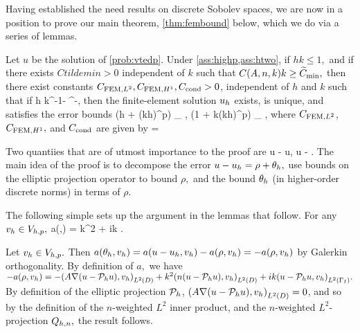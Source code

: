 Having established the need results on discrete Sobolev spaces, we are now in a position to prove our main theorem, \cref{thm:fembound} below, which we do via a series of lemmas.

\label{thm:fembound}
Let $u$ be the solution of \cref{prob:vtedp}. Under \cref{ass:highp,ass:htwo}, if $hk \leq 1,$ and if there exists $Ctildemin > 0$ independent of $k$ such that $\CAnk k \geq \Ctildemin,$ then there exist constants $C_{\mathrm{FEM},L^{2}}, C_{\mathrm{FEM},H^{1}}, C_{\mathrm{cond}} > 0$, independent of $h$ and $k$ such that if
\beq\label{eq:hfemcond}
h \leq \Chcond k^{-1-} \CAnk^{-},
\eeq
then the finite-element solution $u_{h}$ exists, is unique, and satisfies the error bounds
\beqs
{} \leq \CFEMLt \mleft(h + (kh)^p\mright) \inf_{\vh \in \Vhp} , \tand
\eeqs
\beqs
{} \leq \CFEMHo \mleft(1 + k(kh)^p\mright) \inf_{\vh \in \Vhp} ,
\eeqs
where $C_{\mathrm{FEM},L^{2}}$, $C_{\mathrm{FEM},H^{1}},$ and $C_{\mathrm{cond}}$ are given by
\beqs
\Chcond =  \min{}
\eeqs{}
\enth

Two quantiies that are of utmost importance to the proof are
\beqs
\rho \de u - \Ph u, \tand
\eeqs
\beqs
\thetah \de \Ph u - \uh.
\eeqs
The main idea of the proof is to decompose the error $u - u_{h} = \rho + \theta_{h},$ use bounds on the elliptic projection operator to bound $\rho,$ and the bound $\theta_{h}$ (in higher-order discrete norms) in terms of $\rho.$

The following simple  sets up the argument in the lemmas that follow.
\label{lem:simpleform}
For any $v_{h} \in V_{h,p},$
\beq\label{eq:thetaform}
a(\thetah,\vh) = k^2\IPLtDn{\Qhn\rho}{\vh} + ik \IPLtGI{\rho}{\vh}.
\eeq
\ele

Let $v_{h} \in V_{h,p}.$ Then $a(\theta_{h},v_{h}) = a(u-u_{h},v_{h}) - a(\rho,v_{h}) = -a(\rho,v_{h})$ by Galerkin orthogonality. By definition of $a,$ we have $-a(\rho,\vh) = -\IPLtD{A\grad\mleft(u-\Ph u\mright)}{\vh} + k^2 \IPLtD{n\mleft(u-\Ph u\mright)}{\vh} + ik\IPLtGI{u-\Ph u}{\vh}.$ By definition of the elliptic projection $\mathcal P_{h}$, $\IPLtD{A\grad\mleft(u-\Ph u\mright)}{\vh} = 0$, and so by the definition of the $n$-weighted $L^2$ inner product, and the $n$-weighted $L^2$-projection $Q_{h,n},$ the result follows.
\epf

